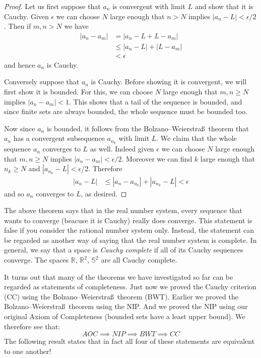 \documentclass[11pt,oneside]{amsbook}
\newcommand{\R}{\mathbb R}
\theoremstyle{definition}
\theoremstyle{plain}
\theoremstyle{definition}
\theoremstyle{remark}
\numberwithin{equation}{section}
\numberwithin{figure}{section}
\begin{document}
\begin{proof}
  Let us first suppose that $a_n$ is convergent with limit $L$ and show that it is Cauchy. Given $\epsilon$ we can choose $N$ large enough that $n>N$ implies $|a_n-L|<\epsilon/2$. Then if $m,n>N$ we have
  \begin{align*}
    |a_n-a_m|&= |a_n-L+L-a_m|\\
             &\leq |a_n-L|+|L-a_m|\\
             &<\epsilon
  \end{align*}
  and hence $a_n$ is Cauchy.
  
  Conversely suppose that $a_n$ is Cauchy. Before showing it is convergent, we will first show it is bounded. For this, we can choose $N$ large enough that $m,n\geq N$ implies $|a_n-a_m|<1$. This shows that a tail of the sequence is bounded, and since finite sets are always bounded, the whole sequence must be bounded too.

  Now since $a_n$ is bounded, it follows from the Bolzano--Weierstra\ss\ theorem that $a_n$ has a convergent subsequence $a_{n_k}$ with limit $L$. We claim that the whole sequence $a_n$ converges to $L$ as well. Indeed given $\epsilon$ we can choose $N$ large enough that $m,n\geq N$ implies $|a_n-a_m|<\epsilon/2$. Moreover we can find $k$ large enough that $n_k\geq N$ and $|a_{n_k}-L|<\epsilon/2$. Therefore
  \begin{align*}
    |a_n-L|&\leq|a_n-a_{n_k}|+|a_{n_k}-L|<\epsilon
  \end{align*}
  and so $a_n$ converges to $L$, as desired.
\end{proof}

The above theorem says that in the real number system, every sequence that wants to converge (beacuse it is Cauchy) really does converge. This statement is false if you consider the rational number system only. Instead, the statement can be regarded as another way of saying that the real number system is complete. In general, we say that a space is \emph{Cauchy complete} if all of its Cauchy sequences converge. The spaces $\R$, $\R^2$, $\mathbb S^2$ are all Cauchy complete.

It turns out that many of the theorems we have investigated so far can be regarded as statements of completeness. Just now we proved the Cauchy criterion (CC) using the Bolzano--Weierstra\ss\ theorem (BWT). Earlier we proved the Bolzano--Weierstra\ss\ theorem using the NIP. And we proved the NIP using our original Axiom of Completeness (bounded sets have a least upper bound). We therefore see that:
\[AOC\implies NIP\implies BWT\implies CC
\]
The following result states that in fact all four of these statements are equivalent to one another!
\end{document}
